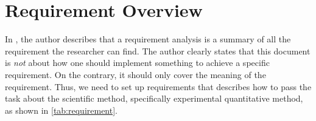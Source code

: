 \documentclass[a4paper,11pt]{kth-mag}
\begin{document}
\chapter{Requirement Overview}\label{app:A}

In \cite{web:requirementoverview}, the author describes that a requirement analysis is a summary of all the requirement the researcher can find.
The author clearly states that this document is \emph{not} about how one should implement something to achieve a specific requirement.
On the contrary, it should only cover the meaning of the requirement.
Thus, we need to set up requirements that describes how to pass the task about the scientific method, specifically experimental quantitative method, as shown in \cref{tab:requirement}.
\end{document}
